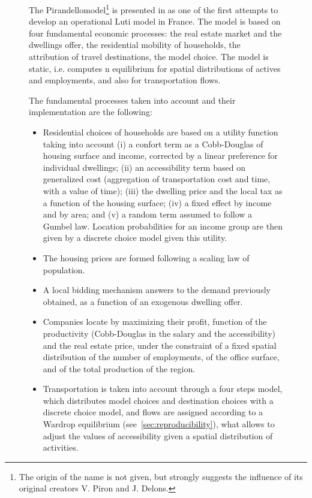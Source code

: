 \documentclass[galley]{jtlu-article-2col}
\begin{document}
\begin{figure}
	\begin{mdframed}

	The Pirandello\textregistered model\footnote{The origin of the name is not given, but strongly suggests the influence of its original creators V. Piron and J. Delons.} is presented in \cite{delons:hal-00319087} as one of the first attempts to develop an operational Luti model in France. The model is based on four fundamental economic processes: the real estate market and the dwellings offer, the residential mobility of households, the attribution of travel destinations, the model choice. The model is static, i.e. computes n equilibrium for spatial distributions of actives and employments, and also for transportation flows.
		
	
	The fundamental processes taken into account and their implementation are the following:
	\begin{itemize}
		\item Residential choices of households are based on a utility function taking into account (i) a confort term as a Cobb-Douglas of housing surface and income, corrected by a linear preference for individual dwellings; (ii) an accessibility term based on generalized cost (aggregation of transportation cost and time, with a value of time); (iii) the dwelling price and the local tax as a function of the housing surface; (iv) a fixed effect by income and by area; and (v) a random term assumed to follow a Gumbel law. Location probabilities for an income group are then given by a discrete choice model given this utility.
		\item The housing prices are formed following a scaling law of population.
		\item A local bidding mechanism answers to the demand previously obtained, as a function of an exogenous dwelling offer.
		\item Companies locate by maximizing their profit, function of the productivity (Cobb-Douglas in the salary and the accessibility) and the real estate price, under the constraint of a fixed spatial distribution of the number of employments, of the office surface, and of the total production of the region.
		\item Transportation is taken into account through a four steps model, which distributes model choices and destination choices with a discrete choice model, and flows are assigned according to a Wardrop equilibrium (see~\ref{sec:reproducibility}), what allows to adjust the values of accessibility given a spatial distribution of activities.
	\end{itemize}
		

\end{mdframed}
\end{figure}
\end{document}

